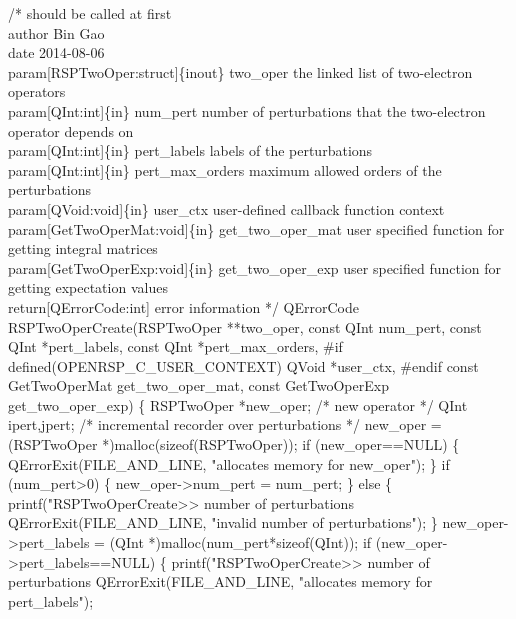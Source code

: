 /*%
        should be called at first
    \\author Bin Gao
    \\date 2014-08-06
    \\param[RSPTwoOper:struct]\{inout\} two_oper the linked list of two-electron operators
    \\param[QInt:int]\{in\} num_pert number of perturbations that the two-electron
        operator depends on
    \\param[QInt:int]\{in\} pert_labels labels of the perturbations
    \\param[QInt:int]\{in\} pert_max_orders maximum allowed orders of the perturbations
    \\param[QVoid:void]\{in\} user_ctx user-defined callback function context
    \\param[GetTwoOperMat:void]\{in\} get_two_oper_mat user specified function for
        getting integral matrices
    \\param[GetTwoOperExp:void]\{in\} get_two_oper_exp user specified function for
        getting expectation values
    \\return[QErrorCode:int] error information
*/
QErrorCode RSPTwoOperCreate(RSPTwoOper **two_oper,
                            const QInt num_pert,
                            const QInt *pert_labels,
                            const QInt *pert_max_orders,
#if defined(OPENRSP_C_USER_CONTEXT)
                            QVoid *user_ctx,
#endif
                            const GetTwoOperMat get_two_oper_mat,
                            const GetTwoOperExp get_two_oper_exp)
\{
    RSPTwoOper *new_oper;  /* new operator */
    QInt ipert,jpert;      /* incremental recorder over perturbations */
    new_oper = (RSPTwoOper *)malloc(sizeof(RSPTwoOper));
    if (new_oper==NULL) \{
        QErrorExit(FILE_AND_LINE, "allocates memory for new_oper");
    \}
    if (num_pert>0) \{
        new_oper->num_pert = num_pert;
    \}
    else \{
        printf("RSPTwoOperCreate>> number of perturbations %
        QErrorExit(FILE_AND_LINE, "invalid number of perturbations");
    \}
    new_oper->pert_labels = (QInt *)malloc(num_pert*sizeof(QInt));
    if (new_oper->pert_labels==NULL) \{
        printf("RSPTwoOperCreate>> number of perturbations %
        QErrorExit(FILE_AND_LINE, "allocates memory for pert_labels");
